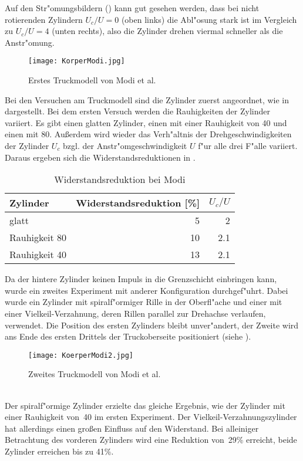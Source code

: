 Auf den Str"omungsbildern () kann gut gesehen werden, dass bei nicht rotierenden Zylindern \(U_c/U=0\) (oben links) die Abl"osung stark ist im Vergleich zu \(U_c/U=4\) (unten rechts), also die Zylinder drehen viermal schneller als die Anstr"omung.\\
\begin{figure}[h]
	\centering
	\texttt{[image: KorperModi.jpg]}
	\caption{Erstes Truckmodell von Modi et al. \cite{MODI.1991}}
	\label{fig:Modi}
\end{figure}
Bei den Versuchen am Truckmodell sind die Zylinder zuerst angeordnet, wie in  dargestellt. Bei dem ersten Versuch werden die Rauhigkeiten der Zylinder variiert. Es gibt einen glatten Zylinder, einen mit einer Rauhigkeit von 40 und einen mit 80. Au\ss{}erdem wird wieder das Verh"altnis der Drehgeschwindigkeiten der Zylinder \(U_c\) bzgl. der Anstr"omgeschwindigkeit \(U\) f"ur alle drei F"alle variiert. Daraus ergeben sich die Widerstandsreduktionen in .\\
\begin{table}[h]
	\centering
	\begin{tabular}{lrr}
		\toprule
		Zylinder & Widerstandsreduktion [\%] & \(U_c/U\)\\
		\midrule
		glatt & 5 & 2\\
		Rauhigkeit 80 & 10 & 2.1\\
		Rauhigkeit 40 & 13 & 2.1\\
		\bottomrule
	\end{tabular}
	\caption{Widerstandsreduktion bei Modi}
	\label{tab:Modi}
\end{table}
Da der hintere Zylinder keinen Impuls in die Grenzschicht einbringen kann, wurde ein zweites Experiment mit anderer Konfiguration durchgef"uhrt. Dabei wurde ein Zylinder mit spiralf"ormiger Rille in der Oberfl"ache und einer mit einer Vielkeil-Verzahnung, deren Rillen parallel zur Drehachse verlaufen, verwendet. Die Position des ersten Zylinders bleibt unver"andert, der Zweite wird ans Ende des ersten Drittels der Truckoberseite positioniert (siehe ).\\
\begin{figure}[h]
	\centering
	\texttt{[image: KoerperModi2.jpg]}
	\caption{Zweites Truckmodell von Modi et al. \cite{MODI.1991}}
	\label{fig:Modi2}
\end{figure}\\
Der spiralf"ormige Zylinder erzielte das gleiche Ergebnis, wie der Zylinder mit einer Rauhigkeit von~40 im ersten Experiment. Der Vielkeil-Verzahnungszylinder hat allerdings einen gro\ss{}en Einfluss auf den Widerstand. Bei alleiniger Betrachtung des vorderen Zylinders wird eine Reduktion von~29\% erreicht, beide Zylinder erreichen bis zu 41\%.

